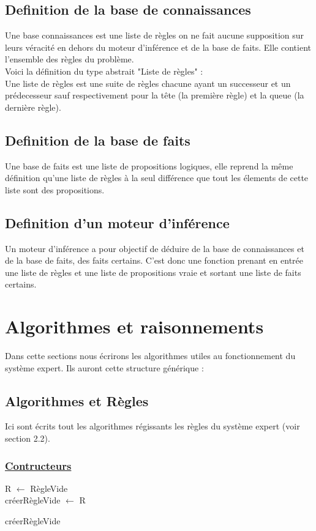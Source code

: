 \documentclass{article}
\begin{document}
\subsection{Definition de la base de connaissances}
Une base connaissances est une liste de règles on ne fait aucune supposition sur leurs véracité en dehors du moteur d'inférence et de la base de faits.
Elle contient l'ensemble des règles du problème.
\\Voici la définition du type abstrait "Liste de règles" : \\
Une liste de règles est une suite de règles chacune ayant un successeur et un prédecesseur sauf respectivement pour la tête (la première règle) et la queue (la dernière règle).

\subsection{Definition de la base de faits}
Une base de faits est une liste de propositions logiques, elle reprend la même définition qu'une liste de règles à la seul différence que tout les élements de cette liste sont des propositions.

\subsection{Definition d'un moteur d'inférence}
Un moteur d'inférence a pour objectif de déduire de la base de connaissances et de la base de faits, des faits certains.
C'est donc une fonction prenant en entrée une liste de règles et une liste de propositions vraie et sortant une liste de faits certains.

\section{Algorithmes et raisonnements}
Dans cette sections nous écrirons les algorithmes utiles au fonctionnement du système expert. Ils auront cette structure générique :

\subsection{Algorithmes et Règles}
Ici sont écrits tout les algorithmes régissants les règles du système expert (voir section 2.2).
\subsubsection{\underline{Contructeurs}}
\begin{algorithm}
    \SetAlgoLined
    R $\longleftarrow$ RègleVide\\
    créerRègleVide $\longleftarrow$ R
    \caption{créerRègleVide}
\end{algorithm}
\end{document}

